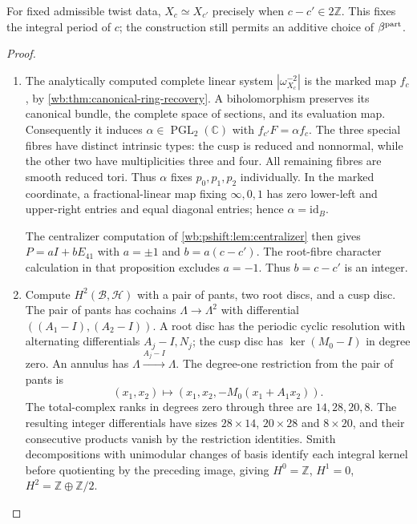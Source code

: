 \begin{theorem}\hypertarget{tag-02YR}{}\label{night:P5.6}\label{stmt:P5.6}

For fixed admissible twist data, $X_c\simeq X_{c'}$ precisely when
$c-c'\in2\mathbb Z$.  This fixes the integral period of $c$; the
construction still permits an additive choice of $\beta^{\rm part}$.
\end{theorem}
\begin{proof}
\begin{enumerate}[label=\arabic*.,leftmargin=*]
\item The analytically computed complete linear system
$|\omega_{X_c}^{-2}|$ is the marked map $f_c$, by
\cref{wb:thm:canonical-ring-recovery}. A biholomorphism preserves its
canonical bundle, the complete space of sections, and its evaluation
map. Consequently it induces $\alpha\in\operatorname{PGL}_2(\mathbb C)$
with $f_{c'}F=\alpha f_c$. The three special fibres have distinct
intrinsic types: the cusp is reduced and nonnormal, while the other
two have multiplicities three and four. All remaining fibres are
smooth reduced tori. Thus $\alpha$ fixes $p_0,p_1,p_2$ individually.
In the marked coordinate, a fractional-linear map fixing
$\infty,0,1$ has zero lower-left and upper-right entries and equal
diagonal entries; hence $\alpha=\mathrm{id}_B$.

The centralizer computation of \cref{wb:pshift:lem:centralizer}
then gives $P=aI+bE_{41}$ with $a=\pm1$ and $b=a(c-c')$.
The root-fibre character calculation in that proposition excludes
$a=-1$. Thus $b=c-c'$ is an integer.

\item Compute $H^2(\mathcal B,\mathcal H)$ with a pair of pants, two root discs,
and a cusp disc.  The pair of pants has cochains $\Lambda\to\Lambda^2$
with differential $((A_1-I),(A_2-I))$.  A root disc has the periodic
cyclic resolution with alternating differentials $A_j-I,N_j$; the
cusp disc has $\ker(M_0-I)$ in degree zero.  An annulus has
$\Lambda\xrightarrow{A_j-I}\Lambda$.  The degree-one restriction from
the pair of pants is
\[
 (x_1,x_2)\longmapsto(x_1,x_2,-M_0(x_1+A_1x_2)).
\]
The total-complex ranks in degrees zero through three are $14,28,20,8$.
The resulting integer differentials have sizes
$28\times14$, $20\times28$ and $8\times20$, and their consecutive
products vanish by the restriction identities.
Smith decompositions with unimodular changes of basis identify each
integral kernel before quotienting by the preceding image, giving
$H^0=\mathbb Z$, $H^1=0$, $H^2=\mathbb Z\oplus\mathbb Z/2$.



\end{enumerate}
\end{proof}
